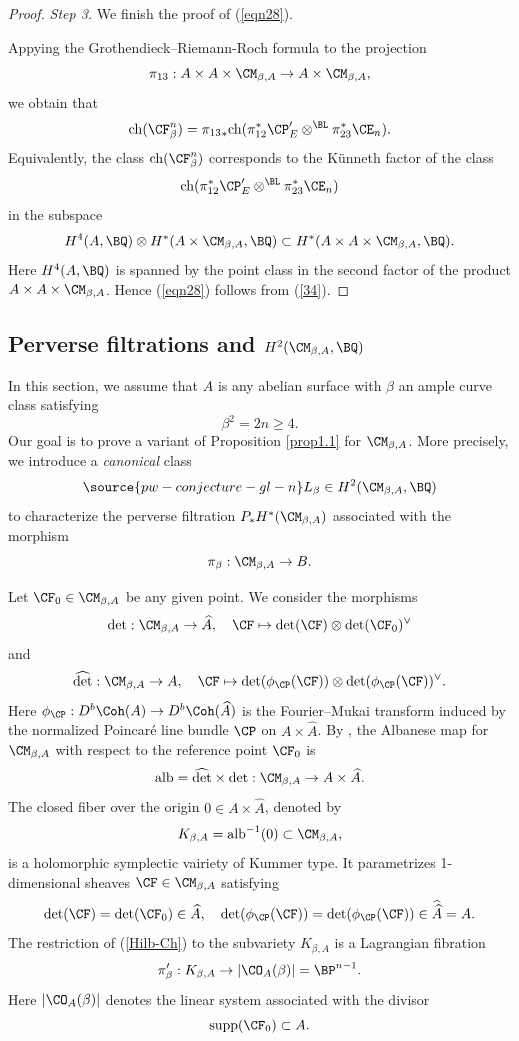 \begin{proof}
 \emph{Step 3.} We finish the proof of (\ref{eqn28}).

Appying the Grothendieck--Riemann-Roch formula to the projection
\[
\pi_{13}: A \times A \times \CM_{\beta, A} \to A \times \CM_{\beta,A},
\]
we obtain that
\[
\mathrm{ch}(\CF^n_\beta) = {\pi_{13}}_\ast \mathrm{ch}(\pi_{12}^\ast {\CP'_{E}} \otimes^{\BL} \pi_{23}^\ast \CE_n).
\]
Equivalently, the class $\mathrm{ch}(\CF^n_\beta)$ corresponds to the K\"unneth factor of the class
\[
\mathrm{ch}(\pi_{12}^\ast {\CP'_{E}} \otimes^{\BL} \pi_{23}^\ast \CE_n)
\]
in the subspace
\[
H^4(A, \BQ) \otimes H^*(A \times \CM_{\beta,A}, \BQ) \subset H^*(A\times A \times \CM_{\beta, A}, \BQ).
\]
Here $H^4(A, \BQ)$ is spanned by the point class in the second factor of the product $A \times A \times \CM_{\beta, A}$. Hence (\ref{eqn28}) follows from (\ref{34}).
\end{proof}


\subsection{Perverse filtrations and $H^2(\CM_{\beta,A}, \BQ)$}
In this section, we assume that $A$ is any abelian surface with $\beta$ an ample curve class satisfying \[\beta^2= 2n \geq 4.\] Our goal is to prove a variant of Proposition \ref{prop1.1} for $\CM_{\beta,A}$.  More precisely, we introduce a \emph{canonical} class
 \begin{equation}\label{ample_base}
\source{pw-conjecture-gl-n}
 L_\beta \in H^2(\CM_{\beta,A} ,\BQ)
 \end{equation}
to characterize the perverse filtration $P_{\ast} H^*(\CM_{\beta, A})$ associated with the morphism
\[
\pi_\beta: \CM_{\beta, A} \to B.
\]


Let $\CF_0 \in \CM_{\beta, A}$ be any given point. We consider the morphisms
\[
\mathrm{det}: \CM_{\beta,A} \to \widehat{A}, \quad \CF \mapsto \mathrm{det}(\CF)\otimes \mathrm{det}(\CF_0)^\vee
\]
and
\[
\widehat{\mathrm{det}}: \CM_{\beta,A} \to A, \quad \CF \mapsto \mathrm{det}(\phi_\CP(\CF)) \otimes \mathrm{det}(\phi_\CP(\CF))^\vee.
\]
Here $\phi_\CP : D^b\Coh(A) \to D^b\Coh(\widehat{A})$ is the Fourier--Mukai transform induced by the normalized Poincar\'e line bundle $\CP$ on $A \times \widehat{A}$. By \cite{Yo}, the Albanese map for $\CM_{\beta,A}$ with respect to the reference point $\CF_0$ is
\[
\mathrm{alb} = \widehat{\mathrm{det}} \times \mathrm{det}: \CM_{\beta,A} \to A \times \widehat{A}.
\]
The closed fiber over the origin $0 \in A\times \widehat{A}$, denoted by
\[
K_{\beta,A} = \mathrm{alb}^{-1}(0) \subset \CM_{\beta, A},
\]
is a holomorphic symplectic vairiety of Kummer type. It parametrizes 1-dimensional sheaves $\CF \in \CM_{\beta,A}$ satisfying
\[
 \mathrm{det}(\CF)= \mathrm{det}(\CF_0) \in \widehat{A},\quad   \mathrm{det}(\phi_\CP(\CF)) = \mathrm{det}(\phi_\CP(\CF)) \in \widehat{\widehat{A}} = A.
\]
The restriction of (\ref{Hilb-Ch}) to the subvariety $K_{\beta, A}$ is a Lagrangian fibration
\[
\pi'_\beta: K_{\beta, A} \to  |\CO_A(\beta)| =  \BP^{n-1}.
\]
Here $ |\CO_A(\beta)|$ denotes the linear system associated with the divisor \[
\mathrm{supp}(\CF_0) \subset A.
\]

